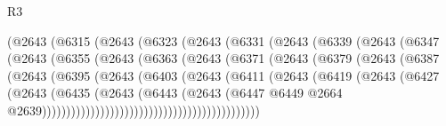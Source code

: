 \begin{lexlean}{R3}
\begin{coremodule}
                      (@2643
                        (@6315
                          (@2643
                            (@6323
                              (@2643
                                (@6331
                                  (@2643
                                    (@6339
                                      (@2643
                                        (@6347
                                          (@2643
                                            (@6355
                                              (@2643
                                                (@6363
                                                  (@2643
                                                    (@6371
                                                      (@2643
                                                        (@6379
                                                          (@2643
                                                            (@6387
                                                              (@2643
                                                                (@6395
                                                                  (@2643
                                                                    (@6403
                                                                      (@2643
                                                                        (@6411
                                                                          (@2643
                                                                            (@6419
                                                                              (@2643
                                                                                (@6427
                                                                                  (@2643
                                                                                    (@6435
                                                                                      (@2643
                                                                                        (@6443
                                                                                          (@2643
                                                                                            (@6447
                                                                                              @6449
                                                                                              @2664
                                                                                              @2639)))))))))))))))))))))))))))))))))))))))))))))

\end{coremodule}
\end{lexlean}
